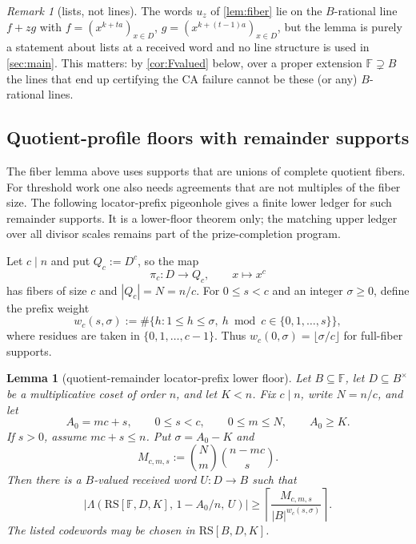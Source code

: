\documentclass[11pt]{article}
\newtheorem{lemma}[theorem]{Lemma}
\theoremstyle{definition}
\theoremstyle{remark}
\newtheorem{remark}[theorem]{Remark}
\newcommand{\F}{\mathbb{F}}
\newcommand{\B}{B}
\newcommand{\RS}{\mathrm{RS}}
\newcommand{\Lst}{\Lambda}
\begin{document}
\begin{remark}[lists, not lines]\label{rem:lines}
The words $u_z$ of \cref{lem:fiber} lie on the $\B$-rational line $f+zg$ with $f=(x^{k+ta})_{x\in D}$, $g=(x^{k+(t-1)a})_{x\in D}$, but the lemma is purely a statement about lists at a received word and no line structure is used in \cref{sec:main}. This matters: by \cref{cor:Fvalued} below, over a proper extension $\F\supsetneq\B$ the lines that end up certifying the CA failure cannot be these (or any) $\B$-rational lines.
\end{remark}

\subsection{Quotient-profile floors with remainder supports}
\label{sec:quotient-remainder}

The fiber lemma above uses supports that are unions of complete quotient fibers.
For threshold work one also needs agreements that are not multiples of the fiber
size.  The following locator-prefix pigeonhole gives a finite lower ledger for
such remainder supports.  It is a lower-floor theorem only; the matching upper
ledger over all divisor scales remains part of the prize-completion program.

Let $c\mid n$ and put $Q_c:=D^c$, so the map
\[
        \pi_c:D\to Q_c,\qquad x\mapsto x^c
\]
has fibers of size $c$ and $|Q_c|=N=n/c$.  For $0\le s<c$ and an integer
$\sigma\ge0$, define the prefix weight
\[
        w_c(s,\sigma)
        :=\#\{h:1\le h\le\sigma,
              \ h\bmod c\in\{0,1,\ldots,s\}\},
\]
where residues are taken in $\{0,1,\ldots,c-1\}$.  Thus
$w_c(0,\sigma)=\lfloor \sigma/c\rfloor$ for full-fiber supports.

\begin{lemma}[quotient-remainder locator-prefix lower floor]
\label{lem:quotient-remainder-prefix}
Let $\B\subseteq\F$, let $D\subseteq\B^\times$ be a multiplicative coset of
order $n$, and let $K<n$.  Fix $c\mid n$, write $N=n/c$, and let
\[
        A_0=mc+s,
        \qquad 0\le s<c,
        \qquad 0\le m\le N,
        \qquad A_0\ge K .
\]
If $s>0$, assume $mc+s\le n$.  Put $\sigma=A_0-K$ and
\[
        M_{c,m,s}:=\binom Nm\binom{n-mc}{s}.
\]
Then there is a $\B$-valued received word $U:D\to\B$ such that
\[
        \bigl|\Lst(\RS[\F,D,K],\,1-A_0/n,\,U)\bigr|
        \ge
        \left\lceil \frac{M_{c,m,s}}{|\B|^{w_c(s,\sigma)}}\right\rceil .
\]
The listed codewords may be chosen in $\RS[\B,D,K]$.
\end{lemma}
\end{document}
